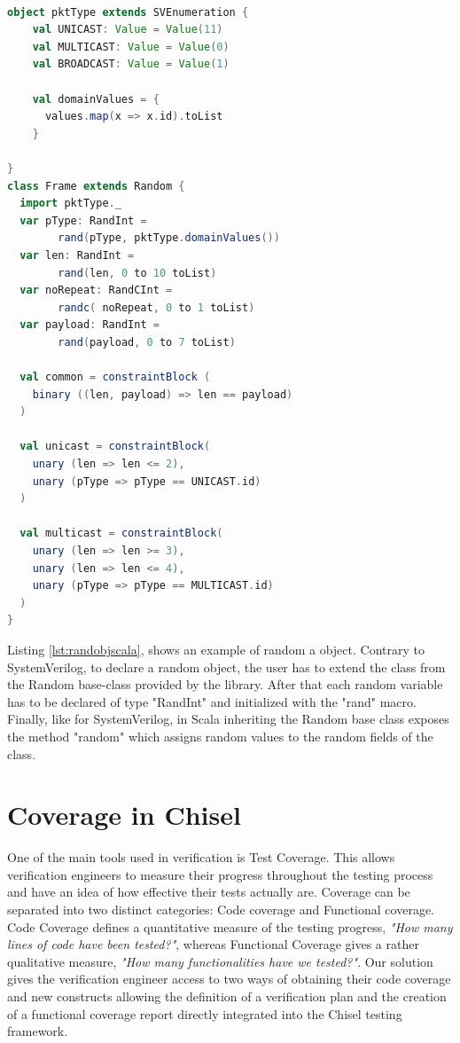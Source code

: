 \documentclass[conference]{IEEEtran}
\begin{document}
\begin{lstlisting}[language=scala, caption={Random object in Scala}, label={lst:randobjscala}]

object pktType extends SVEnumeration {
    val UNICAST: Value = Value(11)
    val MULTICAST: Value = Value(0)
    val BROADCAST: Value = Value(1)
    
    val domainValues = {
      values.map(x => x.id).toList
    }

}
class Frame extends Random {
  import pktType._
  var pType: RandInt = 
        rand(pType, pktType.domainValues())
  var len: RandInt = 
        rand(len, 0 to 10 toList)
  var noRepeat: RandCInt = 
        randc( noRepeat, 0 to 1 toList)
  var payload: RandInt =
        rand(payload, 0 to 7 toList)

  val common = constraintBlock (
    binary ((len, payload) => len == payload)
  )

  val unicast = constraintBlock(
    unary (len => len <= 2),
    unary (pType => pType == UNICAST.id)
  )

  val multicast = constraintBlock(
    unary (len => len >= 3),
    unary (len => len <= 4),
    unary (pType => pType == MULTICAST.id)
  )
}
\end{lstlisting}

Listing \ref{lst:randobjscala}, shows an example of random a object. Contrary to SystemVerilog, to declare a random object, the user has to extend
the class from the Random base-class provided by the library. After that each random variable has to be declared of type "RandInt" and initialized
with the "rand" macro. Finally, like for SystemVerilog, in Scala inheriting the Random base class exposes the method "random" which assigns random
values to the random fields of the class.

\section{Coverage in Chisel}
One of the main tools used in verification is Test Coverage. This allows verification engineers to measure their progress throughout the testing process and have an idea of how effective their tests actually are. Coverage can be separated into two distinct categories: Code coverage and Functional coverage. Code Coverage defines a quantitative measure of the testing progress, \textit{"How many lines of code have been tested?"}, whereas Functional Coverage gives a rather qualitative measure, \textit{"How many functionalities have we tested?"}.  Our solution gives the verification engineer access to two ways of obtaining their code coverage and new constructs allowing the definition of a verification plan and the creation of a functional coverage report directly integrated into the Chisel testing framework.\\
\end{document}
